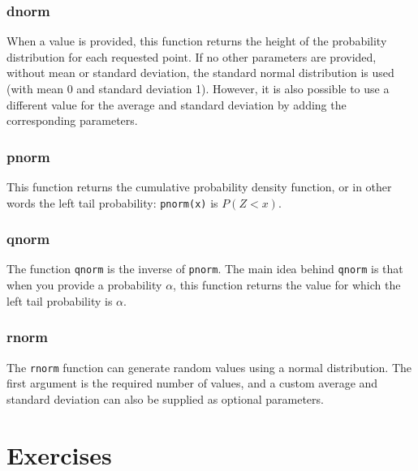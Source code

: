 \subsubsection{dnorm}

When a value is provided, this function returns the height of the probability distribution for each requested point.
If no other parameters are provided, without mean or standard deviation, the standard normal distribution is used (with mean 0 and standard deviation 1).
However, it is also possible to use a different value for the average and standard deviation by adding the corresponding parameters.



\subsubsection{pnorm}

This function returns the cumulative probability density function, or in other words the left tail probability: \texttt{pnorm(x)} is $P(Z < x)$.

\subsubsection{qnorm}
The function \texttt{qnorm} is the inverse of \texttt{pnorm}.
The main idea behind \texttt{qnorm} is that when you provide a probability $\alpha$, 
this function returns the value for which the left tail probability is $\alpha$.



\subsubsection{rnorm}

The \texttt{rnorm} function can generate random values using a normal distribution.
The first argument is the required number of values, and a custom average and standard deviation can also be supplied as optional parameters.






\section{Exercises}
\label{sec:sampling-exercises}

